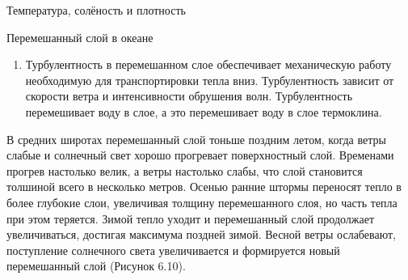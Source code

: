 \begin{chapter}{Температура, солёность и плотность}
\begin{section}{Перемешанный слой в океане}
\begin{enumerate}
\item
Турбулентность в перемешанном слое обеспечивает механическую работу
необходимую для транспортировки тепла вниз. Турбулентность зависит от
скорости ветра и интенсивности обрушения волн. Турбулентность
перемешивает воду в слое, а это перемешивает воду в слое термоклина.
\end{enumerate}
%
% 

В средних широтах перемешанный слой тоньше поздним летом, когда ветры
слабые и солнечный свет хорошо прогревает поверхностный
слой. Временами прогрев настолько велик, а ветры настолько слабы, что
слой становится толшиной всего в несколько метров. Осенью ранние
штормы переносят тепло в более глубокие слои, увеличивая толщину
перемешанного слоя, но часть тепла при этом теряется. Зимой тепло
уходит и перемешанный слой продолжает увеличиваться, достигая
максимума поздней зимой. Весной ветры ослабевают, поступление
солнечного света увеличивается и формируется новый перемешанный слой
(Рисунок 6.10).
%


\end{section}
\end{chapter}
